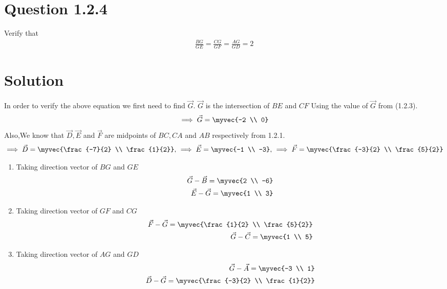 \documentclass[journal,12pt,twocolumn]{IEEEtran}
\theoremstyle{remark}
\begin{document}
\section{Question 1.2.4}Verify that 
\begin{align}
		\frac{BG}{GE} = 
		\frac{CG}{GF} =
		\frac{AG}{GD} = 2 
\end{align}
\section{Solution}In order to verify the above equation we first need to find $\vec{G}$. 
$\vec{G}$ is the intersection of $BE$ and $CF$
Using the value of $\vec{G}$ from (1.2.3).
\begin{align}
		\implies\vec{G} = \myvec{-2 \\ 0}
\end{align}
Also,We know that $\vec{D}, \vec{E}$ and $\vec{F}$ are midpoints of $BC, CA$ and $AB$ respectively from 1.2.1.
\begin{align}
		\implies\vec{D} = \myvec{\frac{-7}{2} \\ \frac{1}{2}},\,
		\implies\vec{E} = \myvec{-1 \\ -3},\,
		\implies\vec{F} = \myvec{\frac{-3}{2} \\ \frac{5}{2}}
\end{align}
\begin{enumerate}
\item Taking direction vector of $BG$ and $GE$ 
\begin{align}
		\label{eq:tri-pts/4} \vec{G}-\vec{B} = \myvec{2 \\ -6} \\
		\label{eq:tri-pts/5} \vec{E}-\vec{G} = \myvec{1 \\ 3} \\
\end{align}		
\item Taking direction vector of $GF$ and $CG$
\begin{align}
		\label{eq:tri-pts/7} \vec{F}-\vec{G} = \myvec{\frac{1}{2} \\ \frac{5}{2}} \\
		\label{eq:tri-pts/8} \vec{G}-\vec{C} = \myvec{1 \\ 5} \\
\end{align}
\item Taking direction vector of $AG$ and $GD$
\begin{align}
		\label{eq:tri-pts/10} \vec{G}-\vec{A} = \myvec{-3 \\ 1} \\
		\label{eq:tri-pts/11} \vec{D}-\vec{G} = \myvec{\frac{-3}{2} \\ \frac{1}{2}}
\end{align}
\end{enumerate}
\end{document}
